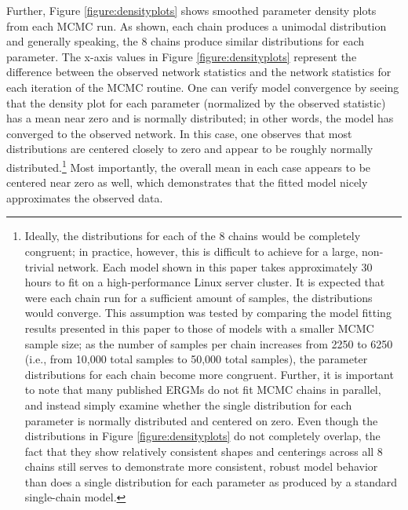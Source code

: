 \documentclass[12pt,a4paper,titlepage]{article}
\begin{document}
Further, Figure \ref{figure:densityplots} shows smoothed parameter density plots from each MCMC run. As shown, each chain produces a unimodal distribution and generally speaking, the 8 chains produce similar distributions for each parameter. The x-axis values in Figure \ref{figure:densityplots} represent the difference between the observed network statistics and the network statistics for each iteration of the MCMC routine. One can verify model convergence by seeing that the density plot for each parameter (normalized by the observed statistic) has a mean near zero and is normally distributed; in other words, the model has converged to the observed network. In this case, one observes that most distributions are centered closely to zero and appear to be roughly normally distributed.\footnote{Ideally, the distributions for each of the 8 chains would be completely congruent; in practice, however, this is difficult to achieve for a large, non-trivial network. Each model shown in this paper takes approximately 30 hours to fit on a high-performance Linux server cluster. It is expected that were each chain run for a sufficient amount of samples, the distributions would converge. This assumption was tested by comparing the model fitting results presented in this paper to those of models with a smaller MCMC sample size; as the number of samples per chain increases from 2250 to 6250 (i.e., from 10,000 total samples to 50,000 total samples), the parameter distributions for each chain become more congruent. Further, it is important to note that many published ERGMs do not fit MCMC chains in parallel, and instead simply examine whether the single distribution for each parameter is normally distributed and centered on zero. Even though the distributions in Figure \ref{figure:densityplots} do not completely overlap, the fact that they show relatively consistent shapes and centerings across all 8 chains still serves to demonstrate more consistent, robust model behavior than does a single distribution for each parameter as produced by a standard single-chain model.} Most importantly, the overall mean in each case appears to be centered near zero as well, which demonstrates that the fitted model nicely approximates the observed data.
\end{document}
